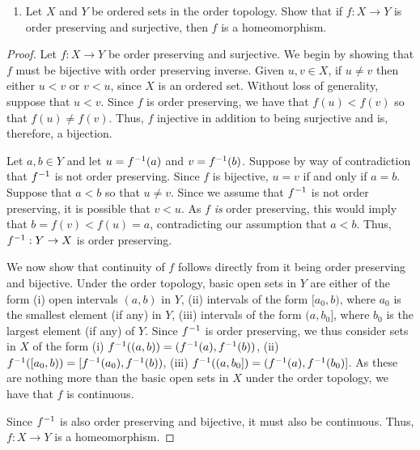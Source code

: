 \begin{solution}
  \begin{enumerate}[label={(\alph*)}, align=left, leftmargin=\parindent, listparindent=\parindent, labelwidth=0pt, itemindent=!]
    \item
      Let $X$ and $Y$ be ordered sets in the order topology.
      Show that if $f: X \rightarrow Y$ is order preserving and surjective, then $f$ is a homeomorphism.
  \end{enumerate}
  \begin{proof}
    Let $f: X \rightarrow Y$ be order preserving and surjective.
    We begin by showing that $f$ must be bijective with order preserving inverse.
    Given $u, v \in X$, if $u \neq v$ then either $u < v$ or $v < u$, since $X$ is an ordered set.
    Without loss of generality, suppose that $u < v$.
    Since $f$ is order preserving, we have that $f(u) < f(v)$ so that $f(u) \neq f(v)$.
    Thus, $f$ injective in addition to being surjective and is, therefore, a bijection.

    Let $a, b \in Y$ and let $u = f^{-1}(a)$ and $v = f^{-1}(b)$.
    Suppose by way of contradiction that $f^{-1}$ is not order preserving.
    Since $f$ is bijective, $u = v$ if and only if $a = b$.
    Suppose that $a < b$ so that $u \neq v$.
    Since we assume that $f^{-1}$ is not order preserving, it is possible that $v < u$.
    As $f$ \textit{is} order preserving, this would imply that $b = f(v) < f(u) = a$, contradicting our assumption that $a < b$.
    Thus, $f^{-1}: Y \rightarrow X$ is order preserving.

    We now show that continuity of $f$ follows directly from it being order preserving and bijective.
    Under the order topology, basic open sets in $Y$ are either of the form (i) open intervals $(a, b)$ in $Y$, (ii) intervals of the form $[a_0, b)$, where $a_0$ is the smallest element (if any) in $Y$, (iii) intervals of the form $(a, b_0]$, where $b_0$ is the largest element (if any) of $Y$.
    Since $f^{-1}$ is order preserving, we thus consider sets in $X$ of the form (i) $f^{-1}((a, b)) = (f^{-1}(a), f^{-1}(b))$, (ii) $f^{-1}([a_0, b)) = [f^{-1}(a_0), f^{-1}(b))$, (iii) $f^{-1}((a, b_0]) = (f^{-1}(a), f^{-1}(b_0)]$.
    As these are nothing more than the basic open sets in $X$ under the order topology, we have that $f$ is continuous.

    Since $f^{-1}$ is also order preserving and bijective, it must also be continuous.
    Thus, $f: X \rightarrow Y$ is a homeomorphism.
  \end{proof}


\end{solution}
